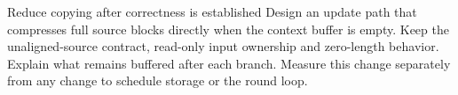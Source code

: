 \begin{MARSExercise}{Reduce copying after correctness is established}
Design an update path that compresses full source blocks directly when the context
buffer is empty. Keep the unaligned-source contract, read-only input ownership and
zero-length behavior. Explain what remains buffered after each branch. Measure this
change separately from any change to schedule storage or the round loop.
\end{MARSExercise}
